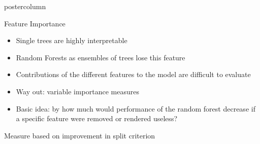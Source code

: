 \documentclass{beamer}
\begin{document}
\begin{frame}[fragile]{}
\begin{columns}
\begin{column}{.31\textwidth}
\begin{beamercolorbox}[center]{postercolumn}
\begin{minipage}{.98\textwidth}
{\begin{myblock}{Feature Importance}
				\begin{itemize}
                    \item Single trees are highly interpretable
                    \item Random Forests as ensembles of trees lose this feature
                    \item Contributions of the different features to the model are difficult to evaluate
                    \item Way out: variable importance measures
                    \item Basic idea: by how much would performance of the random forest decrease if a specific feature were removed or rendered useless?
                \end{itemize}
                
                \hspace*{1ex}
                
                \begin{algorithm}[H]
                \small
                \caption{Measure based on improvement in split criterion}
                \begin{algorithmic}[0]
                \EndFor
                \EndFor
                \end{algorithmic}
                \end{algorithm}
	    	

\end{myblock}}
\end{minipage}
\end{beamercolorbox}
\end{column}
\end{columns}
\end{frame}
\end{document}
